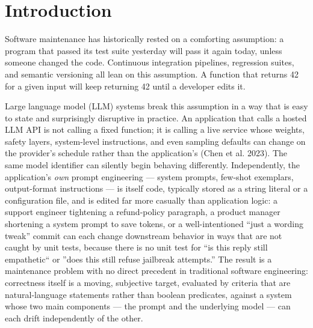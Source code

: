 \documentclass[11pt,a4paper]{article}
\begin{document}
\begin{abstract}
\medskip\noindent\textbf{Keywords:} large language models, LLM-as-a-judge, regression testing, continuous evaluation, MLOps, concept drift, software maintenance
\end{abstract}

\section{Introduction}

Software maintenance has historically rested on a comforting assumption:
a program that passed its test suite yesterday will pass it again today,
unless someone changed the code. Continuous integration pipelines,
regression suites, and semantic versioning all lean on this assumption.
A function that returns 42 for a given input will keep returning 42
until a developer edits it.

Large language model (LLM) systems break this assumption in a way that
is easy to state and surprisingly disruptive in practice. An application
that calls a hosted LLM API is not calling a fixed function; it is
calling a live service whose weights, safety layers, system-level
instructions, and even sampling defaults can change on the
provider's schedule rather than the
application's (Chen et al. 2023). The same model
identifier can silently begin behaving differently. Independently, the
application's \emph{own} prompt engineering --- system
prompts, few-shot exemplars, output-format instructions --- is itself
code, typically stored as a string literal or a configuration file, and
is edited far more casually than application logic: a support engineer
tightening a refund-policy paragraph, a product manager shortening a
system prompt to save tokens, or a well-intentioned ``just a wording
tweak'' commit can each change downstream behavior in ways that are not
caught by unit tests, because there is no unit test for ``is this reply
still empathetic`` or ''does this still refuse jailbreak attempts.'' The
result is a maintenance problem with no direct precedent in traditional
software engineering: correctness itself is a moving, subjective target,
evaluated by criteria that are natural-language statements rather than
boolean predicates, against a system whose two main components --- the
prompt and the underlying model --- can each drift independently of the
other.
\end{document}

